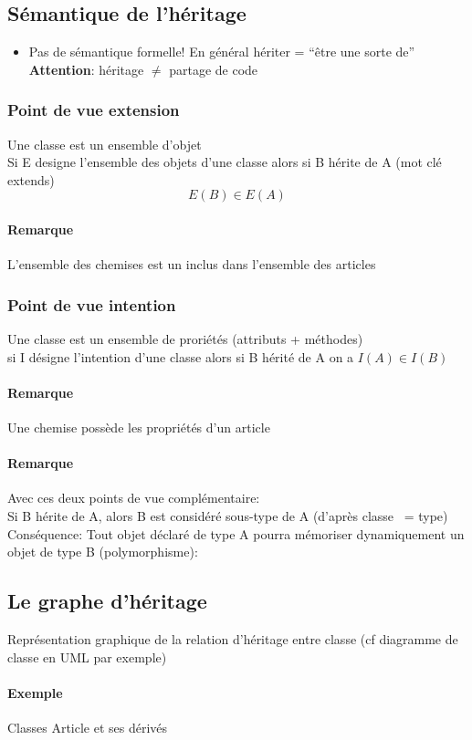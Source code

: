 \subsection{Sémantique de l'héritage}
\begin{itemize}
	\item Pas de sémantique formelle!  En général hériter = ``être une sorte de''
		\textbf{Attention}: héritage $\neq$ partage de code
\end{itemize}
\subsubsection{Point de vue extension}
Une classe est un ensemble d'objet\\
Si E designe l'ensemble des objets d'une classe alors si B hérite de A (mot clé extends)\\
$$E(B) \in E(A)$$
\paragraph{Remarque} L'ensemble des chemises est un inclus dans l'ensemble des articles
\subsubsection{Point de vue intention}
Une classe est un ensemble de proriétés (attributs + méthodes)\\
si I désigne l'intention d'une classe alors si B hérité de A 
on a $I(A) \in I(B)$
\paragraph{Remarque}Une chemise possède les propriétés d'un article
\paragraph{Remarque} Avec ces deux points de vue complémentaire: \\
	Si B hérite de A, alors B est considéré sous-type de A (d'après 
	classe ~= type) \\
	Conséquence: Tout objet déclaré de type A pourra mémoriser
	dynamiquement un objet de type B (polymorphisme):
	\subsection{Le graphe d'héritage}
	Représentation graphique de la relation d'héritage entre classe
	(cf diagramme de classe en UML par exemple)
	\paragraph{Exemple}Classes Article et ses dérivés\\
%			


